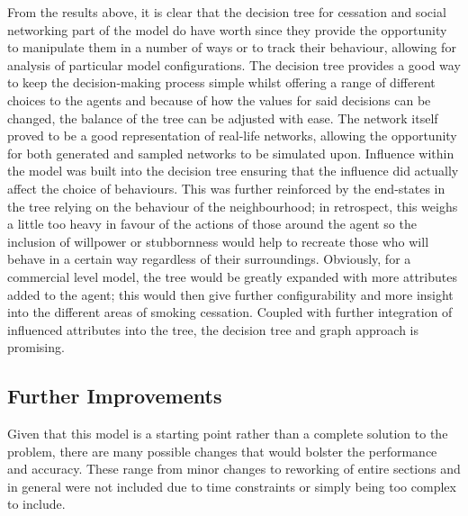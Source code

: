 \documentclass[]{report}
\begin{document}
From the results above, it is clear that the decision tree for cessation and social networking part of the model do have worth since they provide the opportunity to manipulate them in a number of ways or to track their behaviour, allowing for analysis of particular model configurations. The decision tree provides a good way to keep the decision-making process simple whilst offering a range of different choices to the agents and because of how the values for said decisions can be changed, the balance of the tree can be adjusted with ease. The network itself proved to be a good representation of real-life networks, allowing the opportunity for both generated and sampled networks to be simulated upon. Influence within the model was built into the decision tree ensuring that the influence did actually affect the choice of behaviours. This was further reinforced by the end-states in the tree relying on the behaviour of the neighbourhood; in retrospect, this weighs a little too heavy in favour of the actions of those around the agent so the inclusion of willpower or stubbornness would help to recreate those who will behave in a certain way regardless of their surroundings. Obviously, for a commercial level model, the tree would be greatly expanded with more attributes added to the agent; this would then give further configurability and more insight into the different areas of smoking cessation. Coupled with further integration of influenced attributes into the tree, the decision tree and graph approach is promising.

\subsection{Further Improvements}
Given that this model is a starting point rather than a complete solution to the problem, there are many possible changes that would bolster the performance and accuracy. These range from minor changes to reworking of entire sections and in general were not included due to time constraints or simply being too complex to include.
\end{document}

